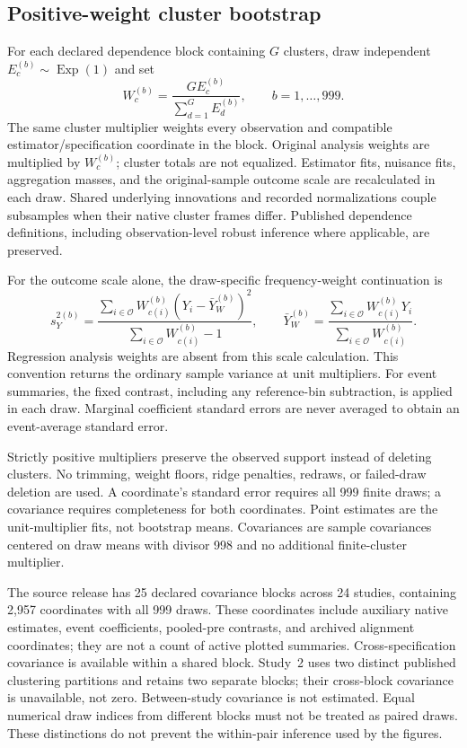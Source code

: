 \documentclass[11pt,letterpaper]{article}
\begin{document}
\subsection{Positive-weight cluster bootstrap}
For each declared dependence block containing $G$ clusters, draw independent $E_c^{(b)}\sim\operatorname{Exp}(1)$ and set
\begin{equation}
W_c^{(b)}=\frac{G E_c^{(b)}}{\sum_{d=1}^G E_d^{(b)}},\qquad b=1,\ldots,999.
\end{equation}
The same cluster multiplier weights every observation and compatible estimator/specification coordinate in the block. Original analysis weights are multiplied by $W_c^{(b)}$; cluster totals are not equalized. Estimator fits, nuisance fits, aggregation masses, and the original-sample outcome scale are recalculated in each draw. Shared underlying innovations and recorded normalizations couple subsamples when their native cluster frames differ. Published dependence definitions, including observation-level robust inference where applicable, are preserved.

For the outcome scale alone, the draw-specific frequency-weight continuation is
\begin{equation}
 s_Y^{2(b)}=
 \frac{\sum_{i\in\mathcal O}W_{c(i)}^{(b)}(Y_i-\bar Y_W^{(b)})^2}
 {\sum_{i\in\mathcal O}W_{c(i)}^{(b)}-1},\qquad
 \bar Y_W^{(b)}=\frac{\sum_{i\in\mathcal O}W_{c(i)}^{(b)}Y_i}
 {\sum_{i\in\mathcal O}W_{c(i)}^{(b)}}.
\end{equation}
Regression analysis weights are absent from this scale calculation. This convention returns the ordinary sample variance at unit multipliers. For event summaries, the fixed contrast, including any reference-bin subtraction, is applied in each draw. Marginal coefficient standard errors are never averaged to obtain an event-average standard error.

Strictly positive multipliers preserve the observed support instead of deleting clusters. No trimming, weight floors, ridge penalties, redraws, or failed-draw deletion are used. A coordinate's standard error requires all 999 finite draws; a covariance requires completeness for both coordinates. Point estimates are the unit-multiplier fits, not bootstrap means. Covariances are sample covariances centered on draw means with divisor 998 and no additional finite-cluster multiplier.

The source release has 25 declared covariance blocks across 24 studies, containing 2,957 coordinates with all 999 draws. These coordinates include auxiliary native estimates, event coefficients, pooled-pre contrasts, and archived alignment coordinates; they are not a count of active plotted summaries. Cross-specification covariance is available within a shared block. Study~2 uses two distinct published clustering partitions and retains two separate blocks; their cross-block covariance is unavailable, not zero. Between-study covariance is not estimated. Equal numerical draw indices from different blocks must not be treated as paired draws. These distinctions do not prevent the within-pair inference used by the figures.
\end{document}
